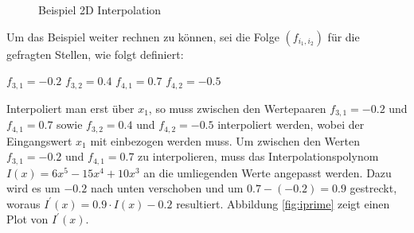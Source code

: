 \documentclass[11pt,a4paper]{article}
\begin{document}
\begin{center}
\begin{figure}[!ht]
\centering
{}
\caption[Beispiel 2D Interpolation]{Beispiel 2D Interpolation}
\end{figure}
\end{center}
\noindent
Um das Beispiel weiter rechnen zu können, sei die Folge $(f_{i_1, i_2})$ für die gefragten Stellen, wie folgt definiert:
\begin{center}
$f_{3, 1} = -0.2$ \hspace{10pt} $f_{3, 2} = 0.4$ \hspace{10pt} $f_{4, 1} = 0.7$ \hspace{10pt} $f_{4, 2} = -0.5$\\
\end{center}
\noindent
Interpoliert man erst über $x_1$, so muss zwischen den Wertepaaren $f_{3, 1} = -0.2$ und $f_{4, 1} = 0.7$ sowie $f_{3, 2} = 0.4$ und $f_{4, 2} = -0.5$ interpoliert werden, wobei der Eingangswert $x_1$ mit einbezogen werden muss. Um zwischen den Werten $f_{3, 1} = -0.2$ und $f_{4, 1} = 0.7$ zu interpolieren, muss das Interpolationspolynom $I(x) = 6x^5-15x^4+10x^3$ an die umliegenden Werte angepasst werden. Dazu wird es um $-0.2$ nach unten verschoben und um $0.7 - (-0.2) = 0.9$ gestreckt, woraus $I^\prime(x) = 0.9 \cdot I(x) - 0.2$ resultiert. Abbildung \ref{fig:iprime} zeigt einen Plot von $I^\prime(x)$.
\end{document}
